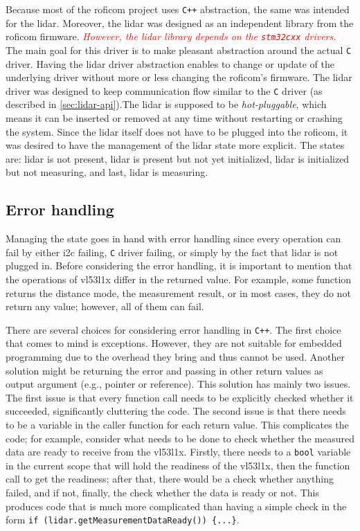 \documentclass[
  digital,     %
  oneside,     %
  nosansbold,  %
  nocolorbold, %
  nolof,         %
  nolot,         %
]{fithesis4}
\newcommand{\TODO}[1]{\textcolor{red}{\textit{#1}}}
\begin{document}
{{{Because most of the \acrshort{roficom} project uses \verb|C++| abstraction, the same was intended for the \acrshort{lidar}. Moreover, the \acrshort{lidar} was designed as an independent library from the \acrshort{roficom} firmware. \TODO{However, the \acrshort{lidar} library depends on the \texttt{stm32cxx} drivers.} The main goal for this driver is to make pleasant abstraction around the actual \verb|C| driver. Having the \acrshort{lidar} driver abstraction enables to change or update of the underlying driver without more or less changing the \acrshort{roficom}'s firmware. The \acrshort{lidar} driver was designed to keep communication flow similar to the \verb|C| driver (as described in \autoref{sec:lidar-api}).The \acrshort{lidar} is supposed to be \emph{hot-pluggable}, which means it can be inserted or removed at any time without restarting or crashing the system. Since the \acrshort{lidar} itself does not have to be plugged into the \acrshort{roficom}, it was desired to have the management of the \acrshort{lidar} state more explicit. The states are: \acrshort{lidar} is not present, \acrshort{lidar} is present but not yet initialized, \acrshort{lidar} is initialized but not measuring, and last, \acrshort{lidar} is measuring. 

\subsection{Error handling}
Managing the state goes in hand with error handling since every operation can fail by either \acrshort{i2c} failing, \verb|C| driver failing, or simply by the fact that \acrshort{lidar} is not plugged in. Before considering the error handling, it is important to mention that the operations of \gls{vl53l1x} differ in the returned value. For example, some function returns the distance mode, the measurement result, or in most cases, they do not return any value; however, all of them can fail.

There are several choices for considering error handling in \verb|C++|. The first choice that comes to mind is exceptions. However, they are not suitable for embedded programming due to the overhead they bring and thus cannot be used. Another solution might be returning the error and passing in other return values as output argument (e.g., pointer or reference). This solution has mainly two issues. The first issue is that every function call needs to be explicitly checked whether it succeeded, significantly cluttering the code. The second issue is that there needs to be a variable in the caller function for each return value. This complicates the code; for example, consider what needs to be done to check whether the measured data are ready to receive from the \gls{vl53l1x}. Firstly, there needs to a \lstinline|bool| variable in the current scope that will hold the readiness of the \gls{vl53l1x}, then the function call to get the readiness; after that, there would be a check whether anything failed, and if not, finally, the check whether the data is ready or not. This produces code that is much more complicated than having a simple check in the form \lstinline[breaklines=false]|if (lidar.getMeasurementDataReady()) {...}|.

}}}
\end{document}
